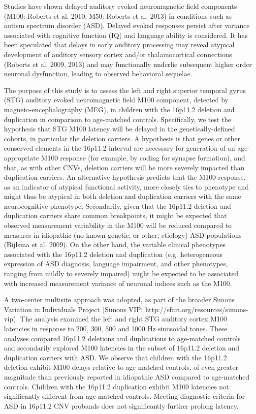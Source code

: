 \documentclass{article}
\begin{document}
Studies have shown delayed auditory evoked neuromagnetic field components (M100: Roberts et al. 2010; M50: Roberts et al. 2013) in conditions such as autism spectrum disorder (ASD). Delayed evoked responses persist after variance associated with cognitive function (IQ) and language ability is considered. It has been speculated that delays in early auditory processing may reveal atypical development of auditory sensory cortex and/or thalamocortical connections (Roberts et al. 2009, 2013) and may functionally underlie subsequent higher order neuronal dysfunction, leading to observed behavioral sequelae.  
\medskip

The purpose of this study is to assess the left and right superior temporal gyrus (STG) auditory evoked neuromagnetic field M100 component, detected by magneto-encephalography (MEG), in children with the 16p11.2 deletion and duplication in comparison to age-matched controls. Specifically, we test the hypothesis that STG M100 latency will be delayed in the genetically-defined cohorts, in particular the deletion carriers. A hypothesis is that genes or other conserved elements in the 16p11.2 interval are necessary for generation of an age-appropriate M100 response (for example, by coding for synapse formation), and that, as with other CNVs, deletion carriers will be more severely impacted than duplication carriers. An alternative hypothesis predicts that the M100 response, as an indicator of atypical functional activity, more closely ties to phenotype and might thus be atypical in both deletion and duplication carriers with the same neurocognitive phenotype. Secondarily, given that the 16p11.2 deletion and duplication carriers share common breakpoints, it might be expected that observed measurement variability in the M100 will be reduced compared to measures in idiopathic (no known genetic, or other, etiology) ASD populations (Bijlsma et al. 2009). On the other hand, the variable clinical phenotypes associated with the 16p11.2 deletion and duplication (e.g. heterogeneous expression of ASD diagnosis, language impairment, and other phenotypes, ranging from mildly to severely impaired) might be expected to be associated with increased measurement variance of neuronal indices such as the M100.  
\medskip

A two-center multisite approach was adopted, as part of the broader Simons Variation in Individuals Project (Simons VIP; http://sfari.org/resources/simons-vip). The analysis examined the left and right STG auditory cortex M100 latencies in response to 200, 300, 500 and 1000 Hz sinusoidal tones. These analyses compared 16p11.2 deletions and duplications to age-matched controls and secondarily explored M100 latencies in the subset of 16p11.2 deletion and duplication carriers with ASD.  We observe that children with the 16p11.2 deletion exhibit M100 delays relative to age-matched controls, of even greater magnitude than previously reported in idiopathic ASD compared to age-matched controls. Children with the 16p11.2 duplication exhibit M100 latencies not significantly different from age-matched controls. Meeting diagnostic criteria for ASD in 16p11.2 CNV probands does not significantly further prolong latency.  
\medskip
\end{document}
